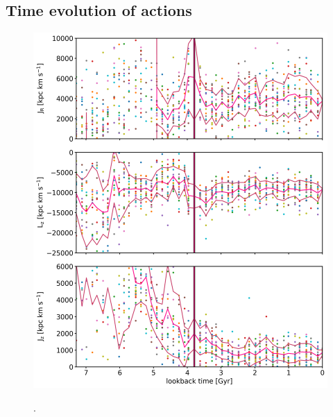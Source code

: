 \subsection{Time evolution of actions}
\begin{figure}[htbp]
    \centering
	\includegraphics[width=\textwidth]{plots/Dynamics/prog2/action_time_evolution_box_hist_mean.png}
	\label{fig:time_ev_all_GCs}
	\caption{.}
\end{figure}

